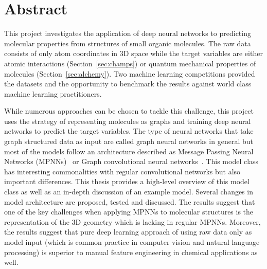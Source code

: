 
%
%


\chapter*{Abstract}

\noindent This project investigates the application of deep neural networks to predicting molecular properties from structures of small organic molecules. The raw data consists of only atom coordinates in 3D space while the target variables are either atomic interactions (Section~\ref{sec:champs}) or quantum mechanical properties of molecules (Section~\ref{sec:alchemy}). Two machine learning competitions provided the datasets and the opportunity to benchmark the results against world class machine learning practitioners.

While numerous approaches can be chosen to tackle this challenge, this project uses the strategy of representing molecules as graphs and training deep neural networks to predict the target variables. The type of neural networks that take graph structured data as input are called graph neural networks in general but most of the models follow an architecture described as Message Passing Neural Networks (MPNNs)~\cite{Gilmer2017} or Graph convolutional neural networks~\cite{Schutt2017}. This model class has interesting commonalities with regular convolutional networks but also important differences. This thesis provides a high-level overview of this model class as well as an in-depth discussion of an example model. Several changes in model architecture are proposed, tested and discussed. The results suggest that one of the key challenges when applying MPNNs to molecular structures is the representation of the 3D geometry which is lacking in regular MPNNs. Moreover, the results suggest that pure deep learning approach of using raw data only as model input (which is common practice in computer vision and natural language processing) is superior to manual feature engineering in chemical applications as well.


\clearpage


\tableofcontents


\clearpage

